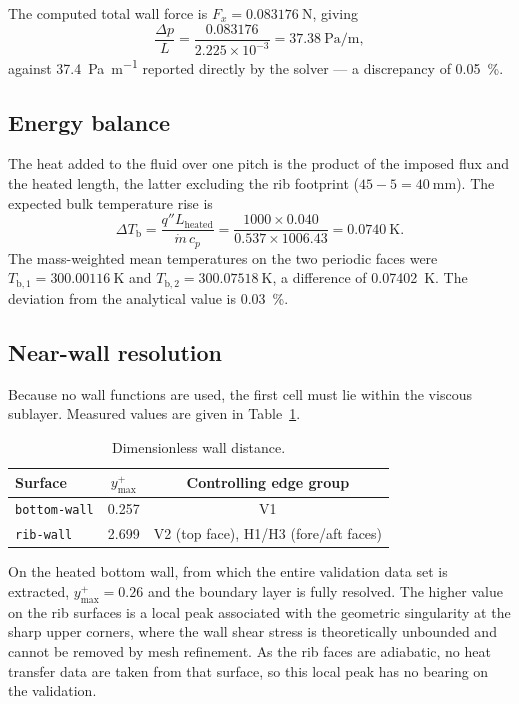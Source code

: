 \documentclass[11pt,a4paper]{article}
\newcommand{\Tb}{T_{\mathrm{b}}}
\begin{document}
The computed total wall force is $F_{x} = \SI{0.083176}{\newton}$, giving
\begin{equation}
  \frac{\Delta p}{L} = \frac{0.083176}{2.225 \times 10^{-3}}
  = \SI{37.38}{\pascal\per\meter},
\end{equation}
against \SI{37.4}{\pascal\per\meter} reported directly by the solver ---
a discrepancy of \SI{0.05}{\percent}.

\subsection{Energy balance}

The heat added to the fluid over one pitch is the product of the imposed
flux and the heated length, the latter excluding the rib footprint
($45 - 5 = \SI{40}{\milli\meter}$). The expected bulk temperature rise is
\begin{equation}
  \Delta \Tb = \frac{q'' L_{\text{heated}}}{\dot{m}\,c_{p}}
  = \frac{1000 \times 0.040}{0.537 \times 1006.43}
  = \SI{0.0740}{\kelvin}.
\end{equation}
The mass-weighted mean temperatures on the two periodic faces were
$T_{\mathrm{b},1} = \SI{300.00116}{\kelvin}$ and
$T_{\mathrm{b},2} = \SI{300.07518}{\kelvin}$,
a difference of \SI{0.07402}{\kelvin}. The deviation from the analytical
value is \SI{0.03}{\percent}.

\subsection{Near-wall resolution}

Because no wall functions are used, the first cell must lie within the
viscous sublayer. Measured values are given in Table~\ref{tab:yplus}.

\begin{table}[htbp]
\centering
\caption{Dimensionless wall distance.}
\label{tab:yplus}
\begin{tabular}{lcc}
\toprule
Surface & $y^{+}_{\max}$ & Controlling edge group \\
\midrule
\texttt{bottom-wall} & 0.257 & V1 \\
\texttt{rib-wall}    & 2.699 & V2 (top face), H1/H3 (fore/aft faces) \\
\bottomrule
\end{tabular}
\end{table}

On the heated bottom wall, from which the entire validation data set is
extracted, $y^{+}_{\max} = 0.26$ and the boundary layer is fully resolved.
The higher value on the rib surfaces is a local peak associated with the
geometric singularity at the sharp upper corners, where the wall shear
stress is theoretically unbounded and cannot be removed by mesh refinement.
As the rib faces are adiabatic, no heat transfer data are taken from that
surface, so this local peak has no bearing on the validation.
\end{document}
